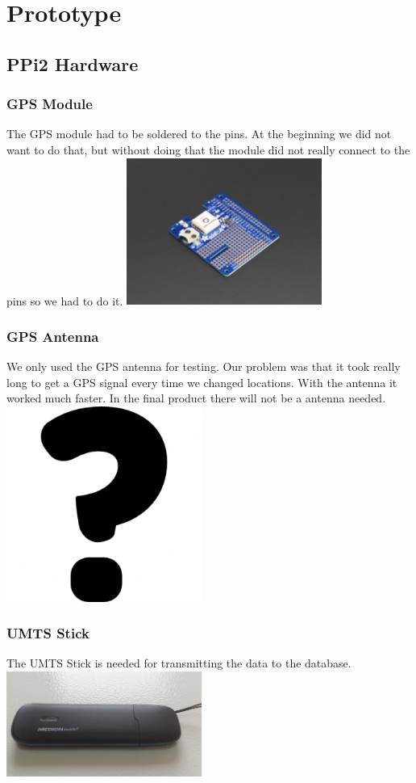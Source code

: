 
\chapter{Prototype}
\section{PPi2 Hardware}
\subsection{GPS Module}
    
The GPS module had to be soldered to the pins. At the beginning we did not want to do that, but without doing that the module did not really connect to the pins so we had to do it.\newline
\includegraphics[width=0.48\textwidth]{bilder/GPS}
\subsection{GPS Antenna}
We only used the GPS antenna for testing. Our problem was that it took really long to get a GPS signal every time we changed locations. With the antenna it worked much faster. In the final product there will not be a antenna needed. \newline 
\includegraphics[width=0.48\textwidth]{bilder/Antenna}
\subsection{UMTS Stick}
The UMTS Stick is needed for transmitting the data to the database.\newline
\includegraphics[width=0.48\textwidth]{bilder/Medion_3}
